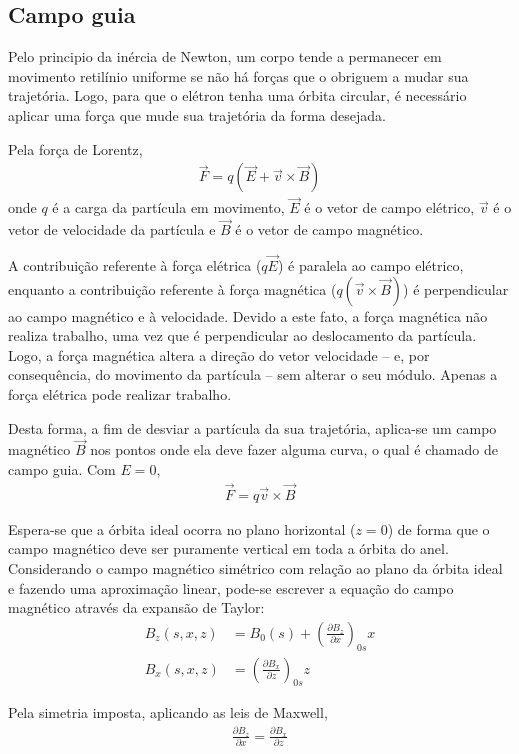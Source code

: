 \subsection{Campo guia}
Pelo principio da inércia de Newton, um corpo tende a permanecer em movimento retilínio uniforme se não há forças que o obriguem a mudar sua trajetória. Logo, para que o elétron tenha uma órbita circular, é necessário aplicar uma força que mude sua trajetória da forma desejada.

Pela força de Lorentz,
\begin{align}
	\vec{F} = q\left(\vec{E} + \vec{v} \times \vec{B}\right)
\end{align}
onde $q$ é a carga da partícula em movimento, $\vec{E}$ é o vetor de campo elétrico, $\vec{v}$ é o vetor de velocidade da partícula e $\vec{B}$ é o vetor de campo magnético.

A contribuição referente à força elétrica ($q\vec{E}$) é paralela ao campo elétrico, enquanto a contribuição referente à força magnética ($q(\vec{v}\times\vec{B})$) é perpendicular ao campo magnético e à velocidade. Devido a este fato, a força magnética não realiza trabalho, uma vez que é perpendicular ao deslocamento da partícula. Logo, a força magnética altera a direção do vetor velocidade -- e, por consequência, do movimento da partícula -- sem alterar o seu módulo. Apenas a força elétrica pode realizar trabalho.

Desta forma, a fim de desviar a partícula da sua trajetória, aplica-se um campo magnético $\vec{B}$ nos pontos onde ela deve fazer alguma curva, o qual é chamado de campo guia. Com $E=0$,
\begin{align}
	\vec{F} = q\vec{v}\times\vec{B}
\end{align}

Espera-se que a órbita ideal ocorra no plano horizontal ($z=0$) de forma que o campo magnético deve ser puramente vertical em toda a órbita do anel. Considerando o campo magnético simétrico com relação ao plano da órbita ideal e fazendo uma aproximação linear, pode-se escrever a equação do campo magnético através da expansão de Taylor:
\begin{align}
	B_z(s,x,z) &= B_0(s) + \left(\frac{\partial B_z}{\partial x}\right)_{0s} x\label{eq:2.01}\\
	B_x(s,x,z) &= \left(\frac{\partial B_x}{\partial z}\right)_{0s} z\label{eq:2.02}
\end{align}

Pela simetria imposta, aplicando as leis de Maxwell,
\begin{align}
	\frac{\partial B_z}{\partial x} = \frac{\partial B_x}{\partial z}
\end{align}

